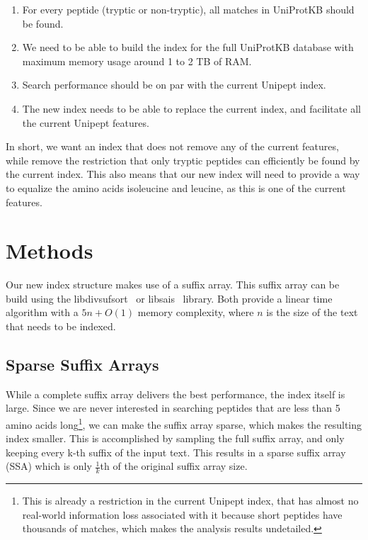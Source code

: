\documentclass[11pt]{article}
\begin{document}
\begin{multicols}{2}
        \begin{enumerate}
            \item For every peptide (tryptic or non-tryptic), all matches in UniProtKB should be found.
            \item We need to be able to build the index for the full UniProtKB database with maximum memory usage around 1 to 2 TB of RAM\@.
            \item Search performance should be on par with the current Unipept index.
            \item The new index needs to be able to replace the current index, and facilitate all the current Unipept features.
        \end{enumerate}

        In short, we want an index that does not remove any of the current features, while remove the restriction that only tryptic peptides can efficiently be found by the current index.
        This also means that our new index will need to provide a way to equalize the amino acids isoleucine and leucine, as this is one of the current features.

        \section{Methods}\label{sec:methods}
        Our new index structure makes use of a suffix array.
        This suffix array can be build using the libdivsufsort~\cite{libdivsufsort} or libsais~\cite{libsais} library.
        Both provide a linear time algorithm with a $5n + O(1)$ memory complexity, where $n$ is the size of the text that needs to be indexed.

        \subsection{Sparse Suffix Arrays}
        While a complete suffix array delivers the best performance, the index itself is large.
        Since we are never interested in searching peptides that are less than 5 amino acids long\footnote{This is already a restriction in the current Unipept index, that has almost no real-world information loss associated with it because short peptides have thousands of matches, which makes the analysis results undetailed.}, we can make the suffix array sparse, which makes the resulting index smaller.
        This is accomplished by sampling the full suffix array, and only keeping every k-th suffix of the input text.
        This results in a sparse suffix array (SSA) which is only $\frac{1}{k}$th of the original suffix array size.


\end{multicols}
\end{document}
